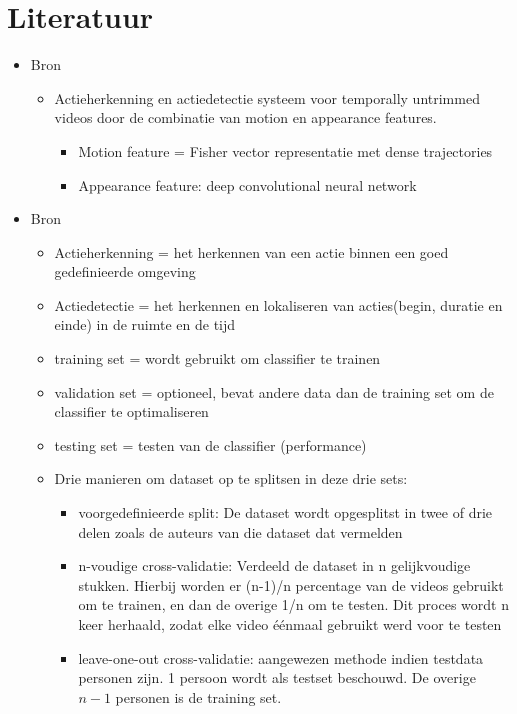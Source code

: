 

\chapter{Literatuur}

\begin{itemize}
	\item Bron \cite{Wang2014}
	\begin{itemize}
		\item Actieherkenning en actiedetectie systeem voor temporally untrimmed videos door de combinatie van motion en appearance features.
		\begin{itemize}
			\item Motion feature = Fisher vector representatie met dense trajectories
			\item Appearance feature: deep convolutional neural network
		\end{itemize}
	\end{itemize}
	\item Bron \cite{MinKang2016}
	\begin{itemize}
		\item Actieherkenning = het herkennen van een actie binnen een goed gedefinieerde omgeving 
		\item Actiedetectie = het herkennen en lokaliseren van acties(begin, duratie en einde) in de ruimte en de tijd
		\item training set = wordt gebruikt om classifier te trainen
		\item validation set = optioneel, bevat andere data dan de training set om de classifier te optimaliseren
		\item testing set = testen van de classifier (performance)
		\item Drie manieren om dataset op te splitsen in deze drie sets:
		\begin{itemize}
			\item voorgedefinieerde split: De dataset wordt opgesplitst  in twee of drie delen zoals de auteurs van die dataset dat vermelden
			\item n-voudige cross-validatie: Verdeeld de dataset in n gelijkvoudige stukken. Hierbij worden er (n-1)/n  percentage van de videos gebruikt om te trainen, en dan de overige 1/n om te testen. Dit proces wordt n keer herhaald, zodat elke video éénmaal gebruikt werd voor te testen
			\item leave-one-out cross-validatie: {\color{green}aangewezen methode indien testdata personen zijn.} 1 persoon wordt als testset beschouwd. De overige $n - 1$ personen is de training set.
		\end{itemize}
		

\end{itemize}
\end{itemize}
